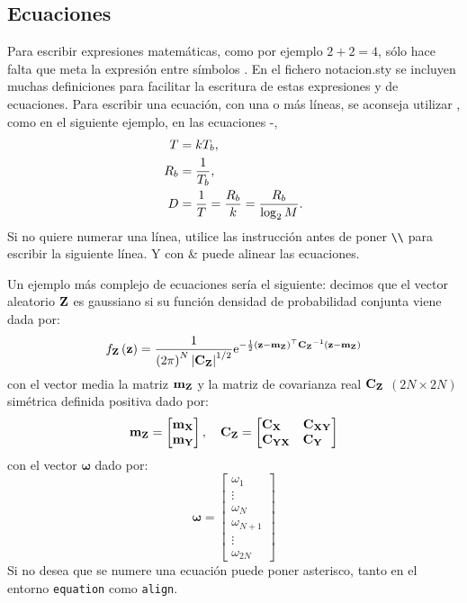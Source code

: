 \subsection{Ecuaciones}%
Para escribir expresiones matemáticas, como por ejemplo $2+2=4$, sólo hace falta que meta la expresión entre símbolos \ttcolor{\$}. En el fichero notacion.sty se incluyen muchas definiciones para facilitar la escritura de estas expresiones y de ecuaciones. Para escribir una ecuación, con una o más líneas, se aconseja utilizar , como en el siguiente ejemplo, en las ecuaciones -,
\begin{align}
 T     &=kT_b  \LABEQ{Eq1}, \\
 R_b&=\frac{1}{T_b }	, \\
 D    &=\frac{1}{T}=\frac{R_b }{k}=\frac{R_b}{\log_2 M}. \LABEQ{Eq3}
\end{align}
Si no quiere numerar una línea, utilice las instrucción  antes de poner \verb+\\+  para escribir la siguiente línea. Y con \& puede alinear las ecuaciones. 

Un ejemplo más complejo de ecuaciones sería el siguiente: decimos que el vector aleatorio $\mathbf{Z}$ es gaussiano si su función densidad de probabilidad conjunta viene dada por:
\begin{equation}\label{eq02-x131}
f_{\mathbf{Z}}\left( {\mathbf{z}} \right)= \frac{1}{\left( {2\pi} \right)^{N}{\left| {\mathbf{C_{Z}}} \right|}^{1/2}}\mathrm{e}^{-\frac{1}{2}\left( {\mathbf{z}-\mathbf{m_{Z}}} \right)^\top\mathbf{C_{Z}}^{-1}\left( {\mathbf{z}-\mathbf{m_{Z}}} \right) }
\end{equation}con el vector media la matriz $\mathbf{m_{Z}}$ y la matriz de covarianza real $\mathbf{C_{Z}}$ $\left( {2N \times 2N} \right)$ simétrica definida positiva dado por:
\begin{equation}\label{eq02-x132}
\mathbf{m_{Z}}=\begin{bmatrix}
\mathbf{m_{X}}\\
\mathbf{m_{Y}}
\end{bmatrix}, \quad
\mathbf{C_{Z}}=\begin{bmatrix}
\mathbf{C_{X\hphantom{X}}} & \mathbf{C}_{\mathbf{XY}}\\
\mathbf{C_{YX}} & \mathbf{C_{Y\hphantom{X}}}
\end{bmatrix}
\end{equation}con el vector $\bm{\omega}$ dado por:
\begin{equation}\label{eq02-y410}
\bm{\omega}=\begin{bmatrix}
\omega_{1}\\
\vdots \\
\omega_{N}\\
\omega_{N+1}\\
\vdots \\
\omega_{2N}
\end{bmatrix}
\end{equation}
Si no desea que se numere una ecuación puede poner asterisco, tanto en el entorno \verb+equation+ como \verb+align+.


